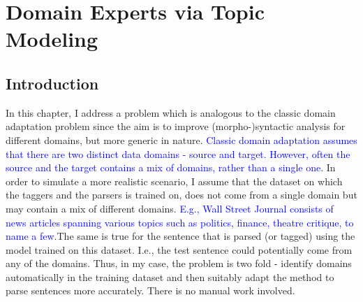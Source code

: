 \chapter{Domain Experts via Topic Modeling}


\section{Introduction}

In this chapter, I address a problem which is analogous to the classic domain adaptation problem since the aim is to improve (morpho-)syntactic analysis for different domains, but more generic in nature. \textcolor{blue}{Classic domain adaptation assumes that there are two distinct data domains - source and target. However, often the source and the target contains a mix of domains, rather than a single one.} In order to simulate a more realistic scenario, I assume that the  dataset on which the taggers and the parsers is trained on, does not come from a single domain but may contain a mix of different domains. \textcolor{blue}{E.g., Wall Street Journal consists of news articles spanning various topics such as politics, finance, theatre critique, to name a few.}The same is true for the sentence that is parsed (or tagged) using the model trained on this dataset. I.e., the test sentence could potentially come from any of the domains. Thus, in my case, the problem is two fold - identify domains automatically in the training dataset and then suitably adapt the method to parse sentences more accurately. There is no manual work involved. 

